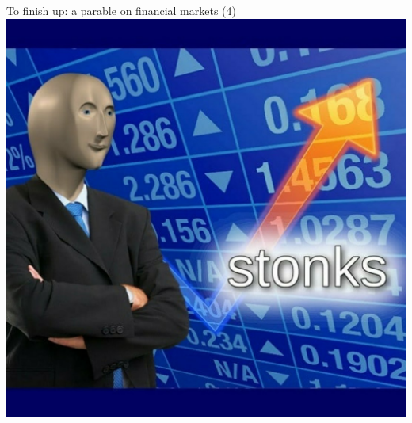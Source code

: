 \begin{frame}{To finish up: a parable on financial markets (4)}
	\centering \includegraphics[width=0.6\paperwidth]{pics/yy4}
\end{frame}


